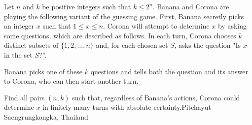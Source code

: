 Let $n$ and $k$ be positive integers such that $k\leq 2^n$. Banana and Corona are playing the following variant of the guessing game. First, Banana secretly picks an integer $x$ such that $1\leq x\leq n$. Corona will attempt to determine $x$ by asking some questions, which are described as follows. In each turn, Corona chooses $k$ distinct subsets of $\{1, 2, \ldots, n\}$ and, for each chosen set $S$,  asks the question  "Is $x$ in the set $S$?''.

Banana picks one of these $k$ questions and tells both the question and its answer to Corona, who can then start another turn.

Find all pairs $(n,k)$ such that, regardless of Banana's actions, Corona could determine $x$ in finitely many turns with absolute certainty.Pitchayut Saengrungkongka, Thailand